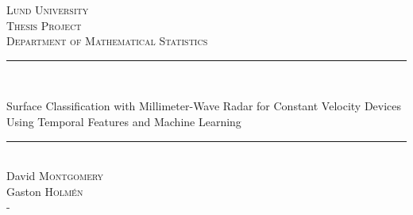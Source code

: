 \begin{titlepage}
\newcommand{\HRule}{\rule{\linewidth}{0.5mm}}

\center
 
\textsc{\LARGE Lund University}\\[1.5cm]
\textsc{\Large Thesis Project}\\[0.5cm]
\textsc{\large Department of Mathematical Statistics}\\[0.5cm]

\HRule \\%
	{ \huge Surface Classification with Millimeter-Wave Radar for Constant Velocity Devices Using Temporal Features and Machine Learning\par}%
\HRule \\[1.5cm]
 

\Large David \textsc{Montgomery} \\
\Large Gaston \textsc{Holm\'en} \\

\vfill-

\end{titlepage}

